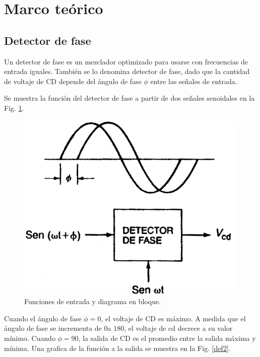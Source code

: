 \documentclass[10pt,a4paper]{IEEEtran}
\begin{document}
    \section{Marco teórico}
    \subsection{Detector de fase}
    Un detector de fase es un mezclador optimizado para usarse con frecuencias de entrada iguales. También se lo denomina detector de fase, dado que la cantidad de voltaje de CD depende del ángulo de fase $\phi$ entre las señales de entrada.
    
    Se muestra la función del detector de fase a partir de dos señales senoidales en la Fig. \ref{def1}.
    
    \begin{figure}[H]
        \centering
        \includegraphics[scale=0.3]{def1.png}
        \caption{Funciones de entrada y diagrama en bloque.}
        \label{def1}
    \end{figure}
    
    Cuando el ángulo de fase $\phi=0$, el voltaje de CD es máximo. A medida que el ángulo de fase se incrementa de $0$\textordmasculine  a $180$\textordmasculine, el voltaje de cd decrece a su valor mínimo. Cuando $\phi=90$\textordmasculine, la salida de CD es el promedio entre la salida máxima y mínima. Una grafica de la función a la salida se muestra en la Fig. \ref{def2}.
    
\end{document}
